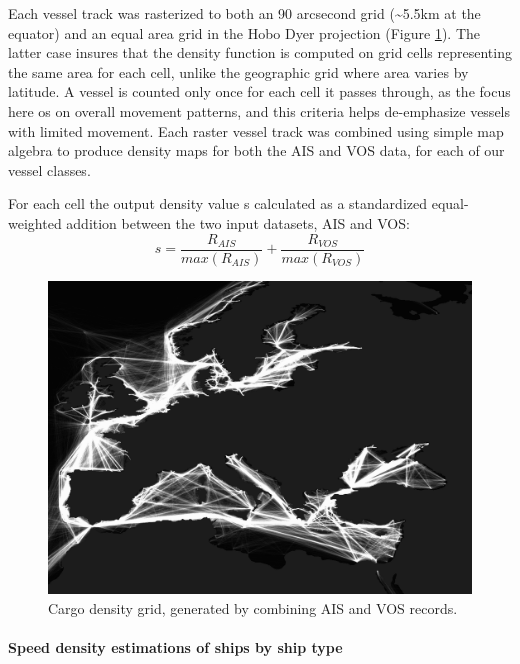 \documentclass[12pt,letterpaper]{article}
\begin{document}
Each vessel track was rasterized to both an 90 arcsecond grid (\textasciitilde{}5.5km at the equator) and an equal area grid in the Hobo Dyer projection (Figure \ref{fig:eu-cargo-density}). The latter case insures that the density function is computed on grid cells representing the same area for each cell, unlike the geographic grid where area varies by latitude. A vessel is counted only once for each cell it passes through, as the focus here os on overall movement patterns, and this criteria helps de-emphasize vessels with limited movement. Each raster vessel track was combined using simple map algebra to produce density maps for both the AIS and VOS data, for each of our vessel classes.

For each cell the output density value s calculated as a standardized equal-weighted addition between the two input datasets, AIS and VOS:
\begin{equation}
 s = \frac{R_{AIS}}{max(R_{AIS})} + \frac{R_{VOS}}{max(R_{VOS})} 
\end{equation}

\begin{figure}[h!]
  \centering
    \includegraphics[width=120mm]{figures/cargo-lanes-eu-cropped.png}
  \caption {Cargo density grid, generated by combining AIS and VOS records.}
  \label{fig:eu-cargo-density}
\end{figure}


\paragraph{Speed density estimations of ships by ship type}
\end{document}
